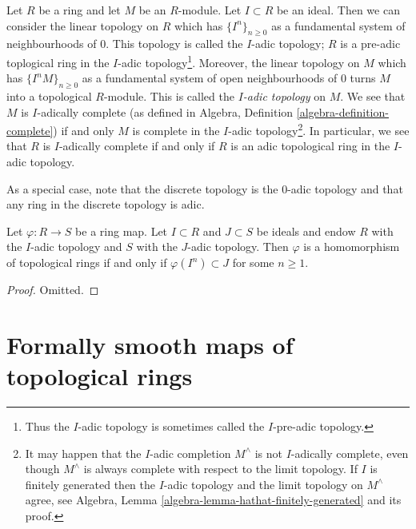 \noindent
Let $R$ be a ring and let $M$ be an $R$-module. Let $I \subset R$ be
an ideal. Then we can consider the linear topology on $R$ which has
$\{I^n\}_{n \geq 0}$ as a fundamental system of neighbourhoods of $0$.
This topology is called the $I$-adic topology; $R$ is a pre-adic
toplogical ring in the $I$-adic topology\footnote{Thus the $I$-adic
topology is sometimes called the $I$-pre-adic topology.}. Moreover, the
linear topology
on $M$ which has $\{I^nM\}_{n \geq 0}$ as a fundamental system of open
neighbourhoods of $0$ turns $M$ into a topological $R$-module.
This is called the {\it $I$-adic topology} on $M$. We see that
$M$ is $I$-adically complete (as defined in
Algebra, Definition \ref{algebra-definition-complete})
if and only $M$ is complete in the $I$-adic topology\footnote{
It may happen that the $I$-adic completion $M^\wedge$
is not $I$-adically complete, even though $M^\wedge$
is always complete with respect to the limit topology. If $I$ is finitely
generated then the $I$-adic topology and the limit topology on $M^\wedge$
agree, see Algebra, Lemma \ref{algebra-lemma-hathat-finitely-generated} and
its proof.}.
In particular, we see that $R$ is $I$-adically complete if and
only if $R$ is an adic topological ring in the $I$-adic topology.

\medskip\noindent
As a special case, note that the discrete topology is the $0$-adic
topology and that any ring in the discrete topology is adic.

\begin{lemma}
\label{lemma-continuous}
Let $\varphi : R \to S$ be a ring map.
Let $I \subset R$ and $J \subset S$ be ideals
and endow $R$ with the $I$-adic topology and $S$ with the $J$-adic
topology. Then $\varphi$ is a homomorphism of topological rings
if and only if $\varphi(I^n) \subset J$ for some $n \geq 1$.
\end{lemma}

\begin{proof}
Omitted.
\end{proof}












\section{Formally smooth maps of topological rings}
\label{section-formally-smooth}


